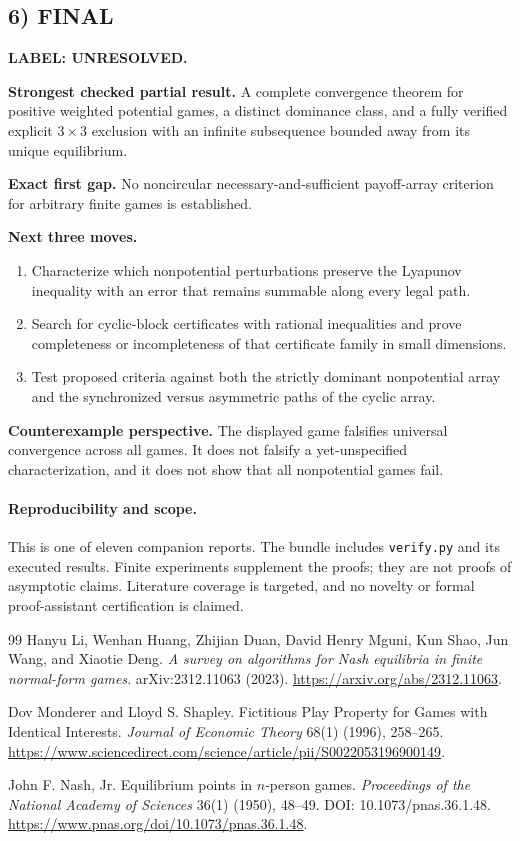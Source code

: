 \documentclass[11pt,a4paper]{article}
\theoremstyle{definition}
\theoremstyle{remark}
\begin{document}
\subsection*{6) FINAL}
\textbf{LABEL: UNRESOLVED.}

\textbf{Strongest checked partial result.} A complete convergence theorem for positive
weighted potential games, a distinct dominance class, and a fully verified explicit
$3\times3$ exclusion with an infinite subsequence bounded away from its unique equilibrium.

\textbf{Exact first gap.} No noncircular necessary-and-sufficient payoff-array
criterion for arbitrary finite games is established.

\textbf{Next three moves.}
\begin{enumerate}[nosep]
\item Characterize which nonpotential perturbations preserve the Lyapunov inequality
with an error that remains summable along every legal path.
\item Search for cyclic-block certificates with rational inequalities and prove
completeness or incompleteness of that certificate family in small dimensions.
\item Test proposed criteria against both the strictly dominant nonpotential array
and the synchronized versus asymmetric paths of the cyclic array.
\end{enumerate}
\textbf{Counterexample perspective.} The displayed game falsifies universal convergence
across all games. It does not falsify a yet-unspecified characterization, and it
does not show that all nonpotential games fail.

\paragraph{Reproducibility and scope.} This is one of eleven companion reports. The bundle includes \texttt{verify.py} and its executed results. Finite experiments supplement the proofs; they are not proofs of asymptotic claims. Literature coverage is targeted, and no novelty or formal proof-assistant certification is claimed.

\begin{thebibliography}{99}
\small
{}
Hanyu Li, Wenhan Huang, Zhijian Duan, David Henry Mguni, Kun Shao, Jun Wang, and Xiaotie Deng.
\emph{A survey on algorithms for Nash equilibria in finite normal-form games}. arXiv:2312.11063 (2023).
\url{https://arxiv.org/abs/2312.11063}.

Dov Monderer and Lloyd S. Shapley.
Fictitious Play Property for Games with Identical Interests.
\emph{Journal of Economic Theory} 68(1) (1996), 258--265.
\url{https://www.sciencedirect.com/science/article/pii/S0022053196900149}.

John F. Nash, Jr. Equilibrium points in $n$-person games.
\emph{Proceedings of the National Academy of Sciences} 36(1) (1950), 48--49.
DOI: 10.1073/pnas.36.1.48.
\url{https://www.pnas.org/doi/10.1073/pnas.36.1.48}.

\end{thebibliography}
\end{document}
